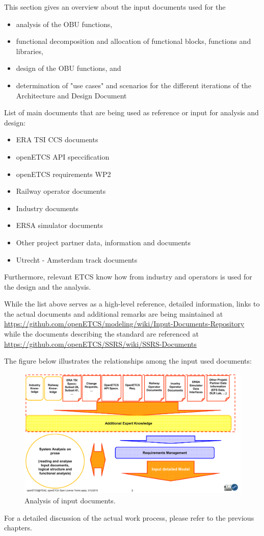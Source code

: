 This section gives an overview about the input documents used for the
\begin{itemize}
\item analysis of the OBU functions,
\item functional decomposition and allocation of functional blocks, functions and libraries,
\item design of the OBU functions, and
\item determination of "use cases" and scenarios for the different iterations of the Architecture and Design Document
\end{itemize} 

List of main documents that are being used as reference or input for analysis and design:
\begin{itemize}
\item ERA TSI CCS documents
\item openETCS API speccification
\item openETCS requirements WP2
\item Railway operator documents
\item Industry documents
\item ERSA simulator documents
\item Other project partner data, information and documents
\item Utrecht - Amsterdam track documents
\end{itemize}

Furthermore, relevant ETCS know how from industry and operators is used for the design and the analysis.

While the list above serves as a high-level reference, detailed information, links to the actual documents and additional remarks are being maintained at
\url{https://github.com/openETCS/modeling/wiki/Input-Documents-Repository}
while the documents describing the standard are referenced at \url{https://github.com/openETCS/SSRS/wiki/SSRS-Documents}

The figure below illustrates  the relationships among the input used documents:

\begin{figure}
\includegraphics[scale=0.5]{images/AnalysisDocuments}
\caption{Analysis of input documents.}
\label{Analyising of input document}
\end{figure}

For a detailed discussion of the actual work process, please refer to the previous chapters. 


